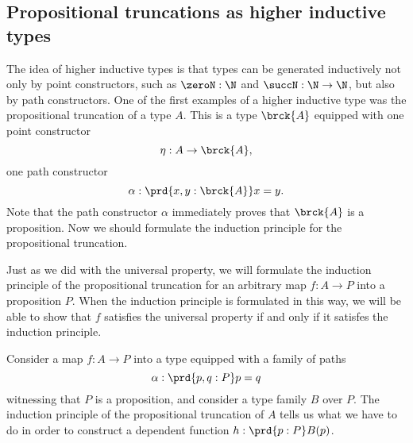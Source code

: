 \subsection{Propositional truncations as higher inductive types}

The idea of higher inductive types is that types can be generated inductively not only by point constructors, such as $\zeroN:\N$ and $\succN:\N\to\N$, but also by path constructors. One of the first examples of a higher inductive type was the propositional truncation of a type $A$. This is a type $\brck{A}$ equipped with one point constructor
\begin{equation*}
  \eta : A \to \brck{A},
\end{equation*}
one path constructor
\begin{equation*}
  \alpha : \prd{x,y:\brck{A}}x=y.
\end{equation*}
Note that the path constructor $\alpha$ immediately proves that $\brck{A}$ is a proposition. Now we should formulate the induction principle for the propositional truncation.

Just as we did with the universal property, we will formulate the induction principle of the propositional truncation for an arbitrary map $f:A\to P$ into a proposition $P$. When the induction principle is formulated in this way, we will be able to show that $f$ satisfies the universal property if and only if it satisfes the induction principle.

Consider a map $f:A\to P$ into a type equipped with a family of paths
\begin{equation*}
  \alpha : \prd{p,q:P}p=q
\end{equation*}
witnessing that $P$ is a proposition, and consider a type family $B$ over $P$. The induction principle of the propositional truncation of $A$ tells us what we have to do in order to construct a dependent function $h:\prd{p:P}B(p)$.

